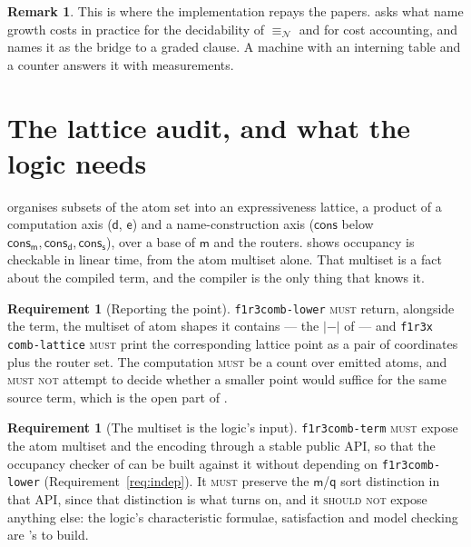 \documentclass[11pt,a4paper]{article}
\newcommand{\code}[1]{\texttt{#1}}
\newcommand{\MUST}{\textsc{must}}
\newcommand{\MUSTNOT}{\textsc{must not}}
\newcommand{\SHOULDNOT}{\textsc{should not}}
\newcommand{\nequiv}{\equiv_{\mathcal{N}}}
\newcommand{\mm}{\mathsf{m}}
\newcommand{\dd}{\mathsf{d}}
\newcommand{\sy}{\mathsf{s}}
\newcommand{\ev}{\mathsf{e}}
\newcommand{\qq}{\mathsf{q}}
\newcommand{\cons}{\mathsf{cons}}
\newcommand{\comps}[1]{\lvert #1 \rvert}
\theoremstyle{definition}
\newtheorem{requirement}[definition]{Requirement}
\newtheorem{remark}[definition]{Remark}
\theoremstyle{plain}
\begin{document}
\begin{remark}
This is where the implementation repays the papers. \cite[\S12]{draft3} asks
what name growth costs in practice for the decidability of $\nequiv$ and for
cost accounting, and \cite[\S7]{logic} names it as the bridge to a graded
clause. A machine with an interning table and a counter answers it with
measurements.
\end{remark}

\section{The lattice audit, and what the logic needs}\label{sec:lattice}

\cite[\S9]{draft3} organises subsets of the atom set into an expressiveness
lattice, a product of a computation axis ($\dd$, $\ev$) and a
name-construction axis ($\cons$ below $\cons_{\mm},\cons_{\dd},\cons_{\sy}$),
over a base of $\mm$ and the routers. \cite[Thm.~6.5]{logic} shows occupancy
is checkable in linear time, from the atom multiset alone. That multiset is a
fact about the compiled term, and the compiler is the only thing that knows
it.

\begin{requirement}[Reporting the point]\label{req:lattice}
\code{f1r3comb-lower} \MUST{} return, alongside the term, the multiset of atom
shapes it contains --- the $\comps{-}$ of \cite[Def.~2.9]{logic} --- and
\code{f1r3x comb-lattice} \MUST{} print the corresponding lattice point as a
pair of coordinates plus the router set. The computation \MUST{} be a count
over emitted atoms, and \MUSTNOT{} attempt to decide whether a smaller point
would suffice for the same source term, which is the open part of
\cite[\S9]{draft3}.
\end{requirement}

\begin{requirement}[The multiset is the logic's input]\label{req:logicinput}
\code{f1r3comb-term} \MUST{} expose the atom multiset and the encoding through
a stable public API, so that the occupancy checker of \cite[\S6]{logic} can be
built against it without depending on \code{f1r3comb-lower}
(Requirement~\ref{req:indep}). It \MUST{} preserve the $\mm$/$\qq$ sort
distinction in that API, since that distinction is what
\cite[Rem.~2.5]{logic} turns on, and it \SHOULDNOT{} expose anything else: the
logic's characteristic formulae, satisfaction and model checking are
\cite{logic}'s to build.
\end{requirement}
\end{document}

